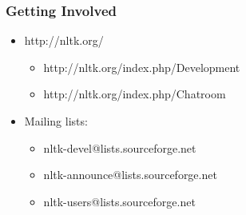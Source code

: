 


\begin{frame}[fragile]\frametitle{Getting Involved}
 \begin{itemize}
 \item http://nltk.org/
   \begin{itemize}
   \item http://nltk.org/index.php/Development
   \item http://nltk.org/index.php/Chatroom
   \end{itemize}
 \item Mailing lists:
   \begin{itemize}
   \item nltk-devel@lists.sourceforge.net
   \item nltk-announce@lists.sourceforge.net
   \item nltk-users@lists.sourceforge.net
   \end{itemize}
 \end{itemize}
\end{frame}

